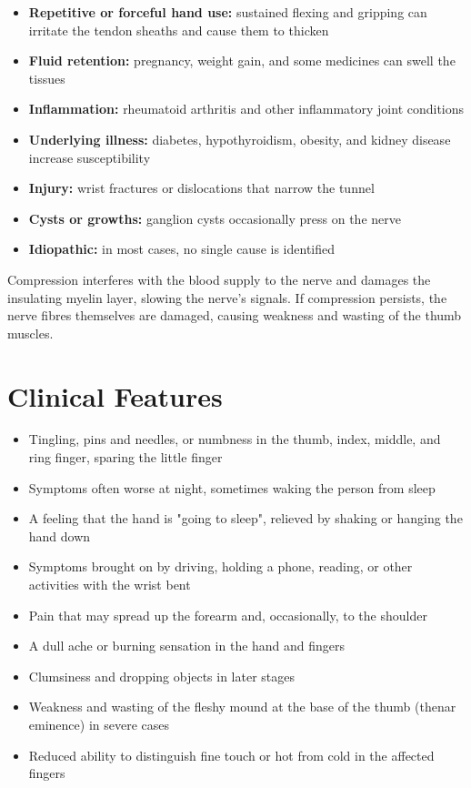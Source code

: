 \begin{itemize}
    \item \textbf{Repetitive or forceful hand use:} sustained flexing and gripping can irritate the tendon sheaths and cause them to thicken
    \item \textbf{Fluid retention:} pregnancy, weight gain, and some medicines can swell the tissues
    \item \textbf{Inflammation:} rheumatoid arthritis and other inflammatory joint conditions
    \item \textbf{Underlying illness:} diabetes, hypothyroidism, obesity, and kidney disease increase susceptibility
    \item \textbf{Injury:} wrist fractures or dislocations that narrow the tunnel
    \item \textbf{Cysts or growths:} ganglion cysts occasionally press on the nerve
    \item \textbf{Idiopathic:} in most cases, no single cause is identified
\end{itemize}

Compression interferes with the blood supply to the nerve and damages the insulating myelin layer, slowing the nerve's signals. If compression persists, the nerve fibres themselves are damaged, causing weakness and wasting of the thumb muscles.

\section*{Clinical Features}
\begin{itemize}
    \item Tingling, pins and needles, or numbness in the thumb, index, middle, and ring finger, sparing the little finger
    \item Symptoms often worse at night, sometimes waking the person from sleep
    \item A feeling that the hand is "going to sleep", relieved by shaking or hanging the hand down
    \item Symptoms brought on by driving, holding a phone, reading, or other activities with the wrist bent
    \item Pain that may spread up the forearm and, occasionally, to the shoulder
    \item A dull ache or burning sensation in the hand and fingers
    \item Clumsiness and dropping objects in later stages
    \item Weakness and wasting of the fleshy mound at the base of the thumb (thenar eminence) in severe cases
    \item Reduced ability to distinguish fine touch or hot from cold in the affected fingers
\end{itemize}

